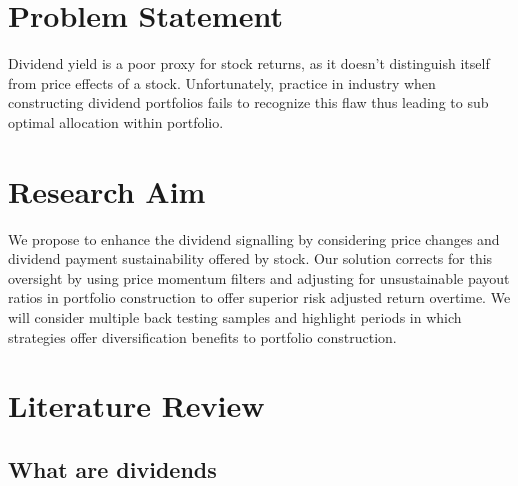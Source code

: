 \documentclass[11pt,preprint, authoryear]{elsarticle}
\numberwithin{equation}{section}
\numberwithin{figure}{section}
\numberwithin{table}{section}
\begin{document}
\hypertarget{problem-statement}{%
\section*{Problem Statement}\label{problem-statement}}

Dividend yield is a poor proxy for stock returns, as it doesn't
distinguish itself from price effects of a stock. Unfortunately,
practice in industry when constructing dividend portfolios fails to
recognize this flaw thus leading to sub optimal allocation within
portfolio.

\hypertarget{research-aim}{%
\section*{Research Aim}\label{research-aim}}

We propose to enhance the dividend signalling by considering price
changes and dividend payment sustainability offered by stock. Our
solution corrects for this oversight by using price momentum filters and
adjusting for unsustainable payout ratios in portfolio construction to
offer superior risk adjusted return overtime. We will consider multiple
back testing samples and highlight periods in which strategies offer
diversification benefits to portfolio construction.

\hypertarget{literature-review}{%
\section*{Literature Review}\label{literature-review}}

\hypertarget{what-are-dividends}{%
\subsection{What are dividends}\label{what-are-dividends}}
\end{document}
